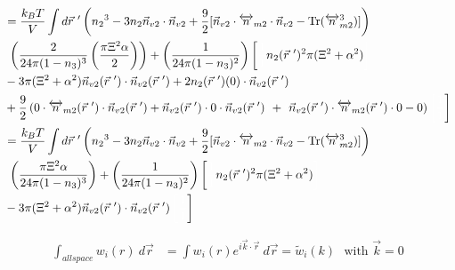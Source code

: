 \documentclass[double,12pt]{beavtex}
\begin{document}
\begin{align} %
%
&=\frac{k_BT}{V}\int d\vec r~' \left( {n_2}^3-3n_2
    \vec{n}_{v2}\cdot\vec{n}_{v2} 
     +\frac{9}{2}[\vec{n}_{v2}\cdot{\overleftrightarrow{n}_{m2}}\cdot{
     \vec{n}_{v2}}-\operatorname{Tr}({\overleftrightarrow{n}^3_{m2}})]
     \right) \nonumber\\
     &~\left(\frac{2}{24\pi(1-n_3)^3}\left(\frac{\pi\Xi^2\alpha}{2}\right)
     \right) + \left(\frac{1}{24\pi(1-n_3)^2}\right)\left[\color{white}
     \frac{1}{1}\color{black}n_2(\vec r~')^2
     \pi(\Xi^2 + \alpha^2) \color{white}\right] \nonumber\\
     &- 3\pi(\Xi^2 + \alpha^2)\vec n_{v2}(\vec r~') \cdot \vec n_{v2}
     (\vec r~') + 2n_2(\vec r~')(0)\cdot \vec n_{v2}(\vec r~')\nonumber \\
     &+\frac{9}{2}\left(0\cdot \overleftrightarrow n_{m2}(\vec r~')\cdot 
     \vec n_{v2}( \vec r~')+\vec n_{v2}(\vec r~')\cdot 0 \cdot \vec n_{v2}
     (\vec r~')\color{white}\right)+ \color{white}\left(\color{black}
     \vec n_{v2}(\vec r~')\cdot\overleftrightarrow n_{m2}(\vec r~')
     \cdot 0-0\right) 
     \color{white}\left[\frac{1}{1}\color{black}\right] \\
%
&=\frac{k_BT}{V}\int d\vec r~' \left({n_2}^3-3n_2
   \vec{n}_{v2}\cdot\vec{n}_{v2} 
    +\frac{9}{2}[\vec{n}_{v2}\cdot{\overleftrightarrow{n}_{m2}}\cdot{
    \vec{n}_{v2}}-\operatorname{Tr}({\overleftrightarrow{n}^3_{m2}})]
    \right) \nonumber\\
    &~\left(\frac{\pi\Xi^2\alpha}{24\pi(1-n_3)^3}
    \right) + \left(\frac{1}{24\pi(1-n_3)^2}\right)\left[\color{white}
    \frac{1}{1}\color{black}n_2(\vec r~')^2
    \pi(\Xi^2 + \alpha^2) \color{white}\right] \\
    &- 3\pi(\Xi^2 + \alpha^2)\vec n_{v2}
    (\vec r~') \cdot \vec n_{v2}(\vec r~')
    \color{white}\left[\frac{1}{1}\color{black}\right]
\end{align}

\begin{align}
   \int_{all space} w_i(r) ~d\vec r &= \int w_i(r)e^{i\vec k \cdot 
   \vec r}~d\vec r 
    = \widetilde{w}_i(k) \mbox{~~with $\vec k = 0$}
\end{align}
\end{document}
